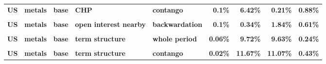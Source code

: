 \documentclass[
  authoryear,
  preprint,
  3p]{elsarticle}
\begin{document}
\begin{landscape}
\begin{longtable}[t]{>{}l>{}l>{}l>{}l>{}l>{}r>{}r>{}r>{}r}
\addlinespace
\textbf{US} & \textbf{metals} & \textbf{base} & \textbf{CHP} & \textbf{contango} & \textcolor[HTML]{4285f4}{\textbf{0.1\%}} & \textcolor[HTML]{4285f4}{\textbf{6.42\%}} & \textcolor[HTML]{4285f4}{\textbf{0.21\%}} & \textcolor[HTML]{4285f4}{\textbf{0.88\%}}\\
\textbf{\cellcolor{gray!10}{US}} & \textbf{\cellcolor{gray!10}{metals}} & \textbf{\cellcolor{gray!10}{base}} & \textbf{\cellcolor{gray!10}{open interest nearby}} & \textbf{\cellcolor{gray!10}{whole period}} & \textcolor[HTML]{4285f4}{\textbf{\cellcolor{gray!10}{0.18\%}}} & \textcolor[HTML]{4285f4}{\textbf{\cellcolor{gray!10}{1.01\%}}} & \textcolor[HTML]{4285f4}{\textbf{\cellcolor{gray!10}{2.78\%}}} & \textcolor[HTML]{4285f4}{\textbf{\cellcolor{gray!10}{0.46\%}}}\\
\textbf{US} & \textbf{metals} & \textbf{base} & \textbf{open interest nearby} & \textbf{backwardation} & \textcolor[HTML]{4285f4}{\textbf{0.1\%}} & \textcolor[HTML]{4285f4}{\textbf{0.34\%}} & \textcolor[HTML]{4285f4}{\textbf{1.84\%}} & \textcolor[HTML]{4285f4}{\textbf{0.61\%}}\\
\textbf{\cellcolor{gray!10}{US}} & \textbf{\cellcolor{gray!10}{metals}} & \textbf{\cellcolor{gray!10}{base}} & \textbf{\cellcolor{gray!10}{open interest nearby}} & \textbf{\cellcolor{gray!10}{contango}} & \textcolor[HTML]{4285f4}{\textbf{\cellcolor{gray!10}{0.24\%}}} & \textcolor[HTML]{4285f4}{\textbf{\cellcolor{gray!10}{1.82\%}}} & \textcolor[HTML]{4285f4}{\textbf{\cellcolor{gray!10}{3.42\%}}} & \textcolor[HTML]{4285f4}{\textbf{\cellcolor{gray!10}{0.37\%}}}\\
\textbf{US} & \textbf{metals} & \textbf{base} & \textbf{term structure} & \textbf{whole period} & \textcolor[HTML]{4285f4}{\textbf{0.06\%}} & \textcolor[HTML]{4285f4}{\textbf{9.72\%}} & \textcolor[HTML]{4285f4}{\textbf{9.63\%}} & \textcolor[HTML]{4285f4}{\textbf{0.24\%}}\\
\addlinespace
\textbf{\cellcolor{gray!10}{US}} & \textbf{\cellcolor{gray!10}{metals}} & \textbf{\cellcolor{gray!10}{base}} & \textbf{\cellcolor{gray!10}{term structure}} & \textbf{\cellcolor{gray!10}{backwardation}} & \textcolor[HTML]{4285f4}{\textbf{\cellcolor{gray!10}{0.37\%}}} & \textcolor[HTML]{4285f4}{\textbf{\cellcolor{gray!10}{7.74\%}}} & \textcolor[HTML]{4285f4}{\textbf{\cellcolor{gray!10}{7.44\%}}} & \textcolor[HTML]{4285f4}{\textbf{\cellcolor{gray!10}{0.12\%}}}\\
\textbf{US} & \textbf{metals} & \textbf{base} & \textbf{term structure} & \textbf{contango} & \textcolor[HTML]{4285f4}{\textbf{0.02\%}} & \textcolor[HTML]{4285f4}{\textbf{11.67\%}} & \textcolor[HTML]{4285f4}{\textbf{11.07\%}} & \textcolor[HTML]{4285f4}{\textbf{0.43\%}}\\

\end{longtable}
\end{landscape}
\end{document}
